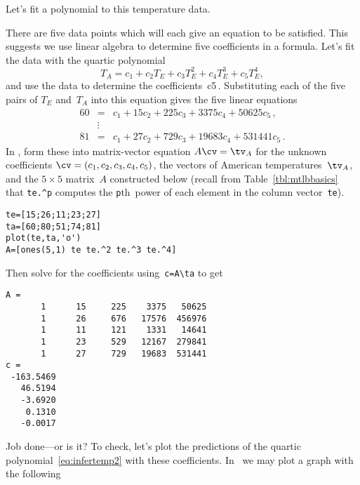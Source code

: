 \begin{example}
Let's fit a polynomial to this temperature data.
\begin{solution}
There are five data points which will each give an equation to be satisfied.
This suggests we use linear algebra to determine five coefficients in a formula.
Let's fit the data with the quartic polynomial
\begin{equation}
T_A=c_1+c_2T_E+c_3T_E^2+c_4T_E^3+c_5T_E^4,
\label{eq:infertemp2}
\end{equation}
and use the data to determine the coefficients~\hlist c5\,.
Substituting each of the five pairs of \(T_E\) and~\(T_A\) into this equation gives the five linear equations
\begin{eqnarray*}
60&=&c_1+15c_2+225c_3+3375c_4+50625c_5\,, \\
&\vdots&\\
81&=&c_1+27c_2+729c_3+19683c_4+531441c_5\,.
\end{eqnarray*}
In \script, form these into matrix-vector equation \(A\cv=\tv_A\) for the unknown coefficients \(\cv=(c_1,c_2,c_3,c_4,c_5)\), the vectors of American temperatures~\(\tv_A\), and the \(5\times5\) matrix~\(A\) constructed below (recall from Table~\ref{tbl:mtlbbasics} that \verb|te.^p| computes the \verb|p|th~power of each element in the column vector~\verb|te|).
\setbox\ajrqrbox\hbox{}%
\marginpar{\usebox{\ajrqrbox\\[2ex]}}%
\begin{verbatim}
te=[15;26;11;23;27]
ta=[60;80;51;74;81]
plot(te,ta,'o')
A=[ones(5,1) te te.^2 te.^3 te.^4]
\end{verbatim}
Then solve for the coefficients using~\verb|c=A\ta| to get
\begin{verbatim}
A =
       1      15     225    3375   50625
       1      26     676   17576  456976
       1      11     121    1331   14641
       1      23     529   12167  279841
       1      27     729   19683  531441
c =
 -163.5469
   46.5194
   -3.6920
    0.1310
   -0.0017
\end{verbatim}
Job done---or is it?
To check, let's plot the predictions of the quartic polynomial~\eqref{eq:infertemp2} with these coefficients.
In \script\ we may plot a graph with the following
\setbox\ajrqrbox\hbox{}%
\marginpar{\usebox{\ajrqrbox\\[2ex]}}%

\end{solution}
\end{example}

